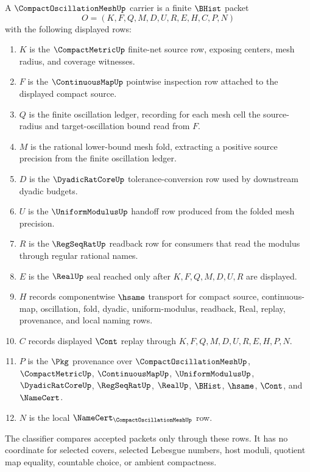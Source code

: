 \begin{definition}
\label{def:compact-oscillation-mesh-carrier}
A $\CompactOscillationMeshUp$ carrier is a finite $\BHist$ packet
$$
O=(K,F,Q,M,D,U,R,E,H,C,P,N)
$$
with the following displayed rows:
\begin{enumerate}
\item $K$ is the $\CompactMetricUp$ finite-net source row, exposing centers, mesh radius, and coverage witnesses.
\item $F$ is the $\ContinuousMapUp$ pointwise inspection row attached to the displayed compact source.
\item $Q$ is the finite oscillation ledger, recording for each mesh cell the source-radius and target-oscillation bound read from $F$.
\item $M$ is the rational lower-bound mesh fold, extracting a positive source precision from the finite oscillation ledger.
\item $D$ is the $\DyadicRatCoreUp$ tolerance-conversion row used by downstream dyadic budgets.
\item $U$ is the $\UniformModulusUp$ handoff row produced from the folded mesh precision.
\item $R$ is the $\RegSeqRatUp$ readback row for consumers that read the modulus through regular rational names.
\item $E$ is the $\RealUp$ seal reached only after $K,F,Q,M,D,U,R$ are displayed.
\item $H$ records componentwise $\hsame$ transport for compact source, continuous-map, oscillation, fold, dyadic, uniform-modulus, readback, Real, replay, provenance, and local naming rows.
\item $C$ records displayed $\Cont$ replay through $K,F,Q,M,D,U,R,E,H,P,N$.
\item $P$ is the $\Pkg$ provenance over $\CompactOscillationMeshUp$, $\CompactMetricUp$, $\ContinuousMapUp$, $\UniformModulusUp$, $\DyadicRatCoreUp$, $\RegSeqRatUp$, $\RealUp$, $\BHist$, $\hsame$, $\Cont$, and $\NameCert$.
\item $N$ is the local $\NameCert_{\CompactOscillationMeshUp}$ row.
\end{enumerate}
The classifier compares accepted packets only through these rows. It has no coordinate for selected covers, selected Lebesgue numbers, host moduli, quotient map equality, countable choice, or ambient compactness.
\end{definition}

